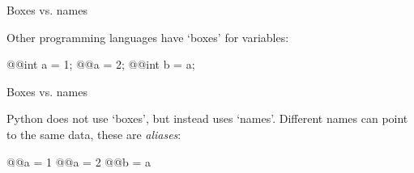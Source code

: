 \documentclass[xetex,10pt]{beamer}
\def\imgpath{../00-img/}
\def\spacer{\vspace*{1em}}
\begin{document}
\begin{frame}[fragile]{Boxes vs. names}
	
	Other programming languages have `boxes' for variables:
	
	\spacer

	\begin{python}
	@@int a = 1;
	@@a = 2;
	@@int b = a;
	\end{python}
	
	\spacer
	
	\begin{center}
	\end{center}
\end{frame}

\begin{frame}[fragile]{Boxes vs. names}
	
	Python does not use `boxes', but instead uses `names'. Different names can point to the same data, these are \emph{aliases}:

	\spacer

	\begin{python}
	@@a = 1
	@@a = 2
	@@b = a
	\end{python}
	
	\spacer
	
	\begin{center}
	\end{center}
\end{frame}
\end{document}
